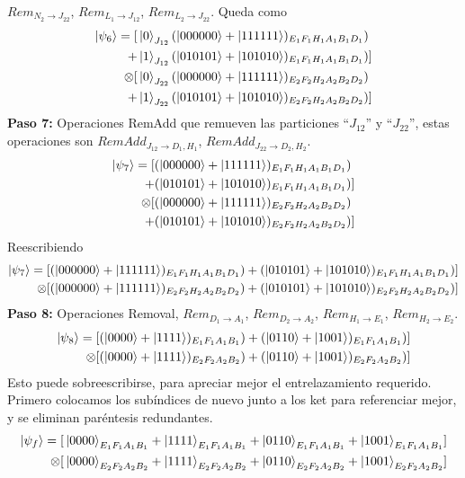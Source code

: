 $Rem_{N_2 \rightarrow J_{22}}$, 
$Rem_{L_1 \rightarrow J_{12}}$, 
$Rem_{L_2 \rightarrow J_{22}}$. Queda como
\begin{align*}
\ket{\psi_6} = [ 
  & \ket{0}_{J_{12}}(\ket{000000}+\ket{111111})_{E_1 F_1 H_1 A_1 B_1 D_1}) \\
+ & \ket{1}_{J_{12}}(\ket{010101}+\ket{101010})_{E_1 F_1 H_1 A_1 B_1 D_1}) ]\\ \otimes 
[ & \ket{0}_{J_{22}}(\ket{000000}+\ket{111111})_{E_2 F_2 H_2 A_2 B_2 D_2}) \\
+ & \ket{1}_{J_{22}}(\ket{010101}+\ket{101010})_{E_2 F_2 H_2 A_2 B_2 D_2}) ]
 \end{align*} 
\textbf{Paso 7:} Operaciones RemAdd que remueven las particiones ``$J_{12}$'' y ``$J_{22}$'', estas operaciones son  $RemAdd_{J_{12}  \rightarrow D_1 , H_1}$,
 $RemAdd_{J_{22}  \rightarrow D_2 , H_2}$.
 \begin{align*}
 \ket{\psi_7} = [ 
  & (\ket{000000}+\ket{111111})_{E_1 F_1 H_1 A_1 B_1 D_1}) \\
+ & (\ket{010101}+\ket{101010})_{E_1 F_1 H_1 A_1 B_1 D_1}) ] \\ \otimes 
[ & (\ket{000000}+\ket{111111})_{E_2 F_2 H_2 A_2 B_2 D_2}) \\
+ & (\ket{010101}+\ket{101010})_{E_2 F_2 H_2 A_2 B_2 D_2}) ]
 \end{align*}
Reescribiendo
\begin{align*}
 \ket{\psi_7} = [ 
  & (\ket{000000}+\ket{111111})_{E_1 F_1 H_1 A_1 B_1 D_1})
+ (\ket{010101}+\ket{101010})_{E_1 F_1 H_1 A_1 B_1 D_1}) ]\\ \otimes 
[ & (\ket{000000}+\ket{111111})_{E_2 F_2 H_2 A_2 B_2 D_2})
+(\ket{010101}+\ket{101010})_{E_2 F_2 H_2 A_2 B_2 D_2}) ]
\end{align*}
\textbf{Paso 8:} Operaciones Removal,  $Rem_{D_1  \rightarrow A_1}$,
 $Rem_{D_2  \rightarrow A_2}$,
 $Rem_{H_1  \rightarrow E_1}$,
 $Rem_{H_2  \rightarrow E_2}$.
\begin{align*}
 \ket{\psi_8} = [ 
  & (\ket{0000}+\ket{1111})_{E_1 F_1 A_1 B_1})
+ (\ket{0110}+\ket{1001})_{E_1 F_1 A_1 B_1}) ]\\ \otimes 
[ & (\ket{0000}+\ket{1111})_{E_2 F_2 A_2 B_2 })
+ (\ket{0110}+\ket{1001})_{E_2 F_2A_2 B_2}) ]
\end{align*}
Esto puede sobreescribirse, para apreciar mejor el entrelazamiento requerido. Primero colocamos los subíndices de nuevo junto a los ket para referenciar mejor, y se eliminan paréntesis redundantes.
\begin{align*}
 \ket{\psi_f} = [ 
  & \ket{0000}_{E_1 F_1 A_1 B_1}+\ket{1111}_{E_1 F_1 A_1 B_1}
+ \ket{0110}_{E_1 F_1 A_1 B_1}+\ket{1001}_{E_1 F_1 A_1 B_1} ]\\ \otimes 
[ & \ket{0000}_{E_2 F_2 A_2 B_2 }+\ket{1111}_{E_2 F_2 A_2 B_2 }
+ \ket{0110}_{E_2 F_2 A_2 B_2 }+\ket{1001}_{E_2 F_2 A_2 B_2 } ]
\end{align*}
